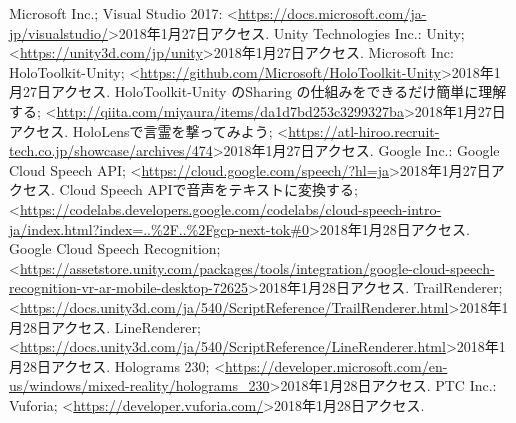 \documentclass[11pt,a4j, titlepage]{jarticle} %
\begin{document}
\begin{thebibliography}{数字}
   Microsoft Inc.; Visual Studio 2017: \textless\url{https://docs.microsoft.com/ja-jp/visualstudio/}\textgreater2018年1月27日アクセス.
   Unity Technologies Inc.: Unity;  \textless\url{https://unity3d.com/jp/unity}\textgreater2018年1月27日アクセス.
   Microsoft Inc: HoloToolkit-Unity; \textless\url{https://github.com/Microsoft/HoloToolkit-Unity}\textgreater2018年1月27日アクセス.
   HoloToolkit-Unity のSharing の仕組みをできるだけ簡単に理解する; \textless\url{http://qiita.com/miyaura/items/da1d7bd253c3299327ba}\textgreater2018年1月27日アクセス.
   HoloLensで言霊を撃ってみよう;  \textless\url{https://atl-hiroo.recruit-tech.co.jp/showcase/archives/474}\textgreater2018年1月27日アクセス.
   Google Inc.: Google Cloud Speech API; \textless\url{https://cloud.google.com/speech/?hl=ja}\textgreater2018年1月27日アクセス.
   Cloud Speech APIで音声をテキストに変換する; \textless\url{https://codelabs.developers.google.com/codelabs/cloud-speech-intro-ja/index.html?index=..\%2F..\%2Fgcp-next-tok\#0}\textgreater2018年1月28日アクセス.
   Google Cloud Speech Recognition;  \textless\url{https://assetstore.unity.com/packages/tools/integration/google-cloud-speech-recognition-vr-ar-mobile-desktop-72625}\textgreater2018年1月28日アクセス.
   TrailRenderer; \textless\url{https://docs.unity3d.com/ja/540/ScriptReference/TrailRenderer.html}\textgreater2018年1月28日アクセス.
   LineRenderer; \textless\url{https://docs.unity3d.com/ja/540/ScriptReference/LineRenderer.html}\textgreater2018年1月28日アクセス.
   Holograms 230; \textless\url{https://developer.microsoft.com/en-us/windows/mixed-reality/holograms_230}\textgreater2018年1月28日アクセス.
   PTC Inc.: Vuforia; \textless\url{https://developer.vuforia.com/}\textgreater2018年1月28日アクセス.
\end{thebibliography}
\end{document}
